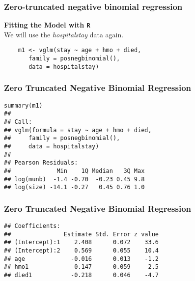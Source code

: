 \documentclass[MASTER.tex]{subfiles}
\begin{document}
\begin{frame}[fragile]
\frametitle{Zero-truncated negative binomial regression}
\large
\textbf{Fitting the Model with \texttt{R}}\\
We will use the \textit{hospitalstay} data again.
\begin{framed}
\begin{verbatim}
	m1 <- vglm(stay ~ age + hmo + died, 
	   family = posnegbinomial(), 
	   data = hospitalstay)

\end{verbatim}
\end{framed}
\end{frame}
\begin{frame}[fragile]
\frametitle{Zero Truncated Negative Binomial Regression}
\begin{verbatim}
summary(m1)
## 
## Call:
## vglm(formula = stay ~ age + hmo + died, 
##     family = posnegbinomial(), 
##     data = hospitalstay)
## 
## Pearson Residuals:
##             Min    1Q Median   3Q Max
## log(munb)  -1.4 -0.70  -0.23 0.45 9.8
## log(size) -14.1 -0.27   0.45 0.76 1.0
\end{verbatim}
\end{frame}
\begin{frame}[fragile]
	\frametitle{Zero Truncated Negative Binomial Regression}
	\begin{verbatim}
## Coefficients:
##               Estimate Std. Error z value
## (Intercept):1    2.408      0.072    33.6
## (Intercept):2    0.569      0.055    10.4
## age             -0.016      0.013    -1.2
## hmo1            -0.147      0.059    -2.5
## died1           -0.218      0.046    -4.7
\end{verbatim}
\end{frame}
\end{document}
